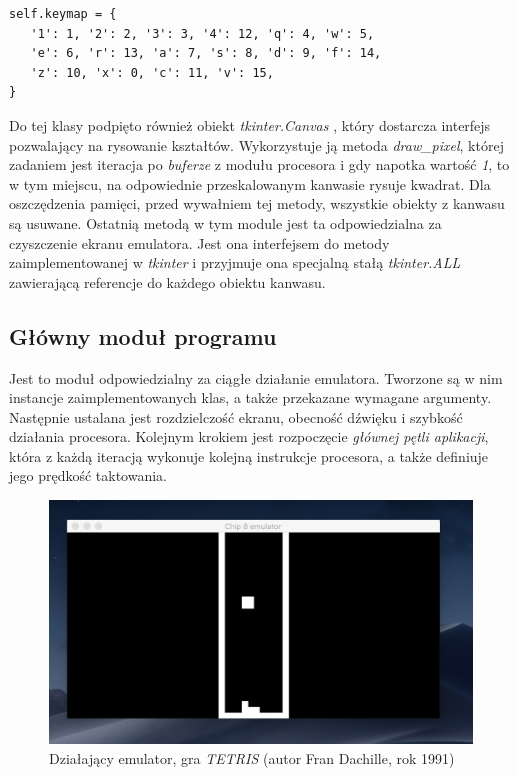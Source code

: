 \begin{lstlisting}[caption={Słownik z mapowaniem klawiszy (wartości w nawiasach, to rzeczywiste klawisze)},captionpos=b]
self.keymap = {
   '1': 1, '2': 2, '3': 3, '4': 12, 'q': 4, 'w': 5,
   'e': 6, 'r': 13, 'a': 7, 's': 8, 'd': 9, 'f': 14,
   'z': 10, 'x': 0, 'c': 11, 'v': 15,
}
\end{lstlisting}
Do tej klasy podpięto również obiekt \textit{tkinter.Canvas} \cite{TKINTER}, który dostarcza interfejs pozwalający na rysowanie kształtów. Wykorzystuje ją metoda  \textit{draw\_pixel}, której zadaniem jest iteracja po \textit{buferze} z modułu procesora i gdy napotka wartość \textit{1}, to w tym miejscu, na odpowiednie przeskalowanym kanwasie rysuje kwadrat. Dla oszczędzenia pamięci, przed wywałniem tej metody, wszystkie obiekty z kanwasu są usuwane. Ostatnią metodą w tym module jest ta odpowiedzialna za czyszczenie ekranu emulatora. Jest ona interfejsem do metody zaimplementowanej w \textit{tkinter} i przyjmuje ona specjalną stałą \textit{tkinter.ALL} zawierającą referencje do każdego obiektu kanwasu.


\subsection{Główny moduł programu}

Jest to moduł odpowiedzialny za ciągłe działanie emulatora. Tworzone są w nim instancje zaimplementowanych klas, a także przekazane wymagane argumenty. Następnie ustalana jest rozdzielczość ekranu, obecność dźwięku i szybkość działania procesora. Kolejnym krokiem jest rozpoczęcie \textit{głównej pętli aplikacji}, która z każdą iteracją wykonuje kolejną instrukcje procesora, a także definiuje jego prędkość taktowania.
\begin{figure}[!htb]
\begin{center}
	\includegraphics[scale=0.4]{images/workingApp}
	\caption{Działający emulator, gra \textit{TETRIS} (autor Fran Dachille, rok 1991)}
\end{center}
\end{figure}

